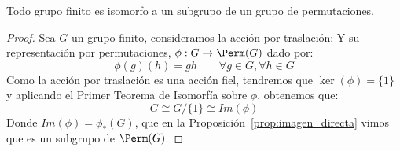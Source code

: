 \begin{teo}[Cayley]
    Todo grupo finito es isomorfo a un subgrupo de un grupo de permutaciones.
    \begin{proof}
        Sea $G$ un grupo finito, consideramos la acción por traslación:
        Y su representación por permutaciones, $\phi:G\to \Perm(G)$ dado por:
        \begin{equation*}
            \phi(g)(h) = gh \qquad \forall g\in G, \forall h\in G
        \end{equation*}
        Como la acción por traslación es una acción fiel, tendremos que $\ker(\phi) = \{1\}$ y aplicando el Primer Teorema de Isomorfía sobre $\phi$, obtenemos que:
        \begin{equation*}
            G \cong G/\{1\} \cong Im(\phi)
        \end{equation*}
        Donde $Im(\phi) = \phi_\ast(G)$, que en la Proposición~\ref{prop:imagen_directa} vimos que es un subgrupo de $\Perm(G)$.
    \end{proof}
\end{teo}

